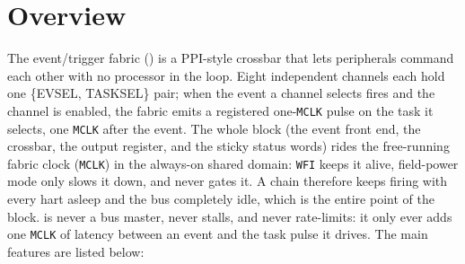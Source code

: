 \section{Overview}

The event/trigger fabric () is a PPI-style crossbar that lets peripherals command each other with no processor in the loop. Eight independent channels each hold one \{EVSEL, TASKSEL\} pair; when the event a channel selects fires and the channel is enabled, the fabric emits a registered one-\texttt{MCLK} pulse on the task it selects, one \texttt{MCLK} after the event. The whole block (the event front end, the crossbar, the output register, and the sticky status words) rides the free-running fabric clock (\texttt{MCLK}) in the always-on shared domain: \texttt{WFI} keeps it alive, field-power mode only slows it down, and  never gates it. A chain therefore keeps firing with every hart asleep and the bus completely idle, which is the entire point of the block.  is never a bus master, never stalls, and never rate-limits: it only ever adds one \texttt{MCLK} of latency between an event and the task pulse it drives. The main features are listed below:


